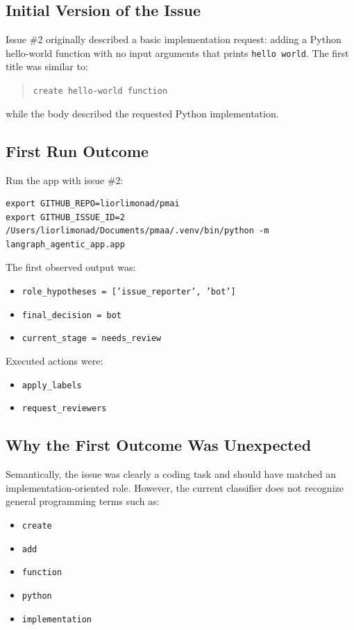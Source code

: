 \documentclass[11pt,a4paper]{article}
\begin{document}
\subsection{Initial Version of the Issue}

Issue \#2 originally described a basic implementation request: adding a Python hello-world function with no input arguments that prints \texttt{hello world}. The first title was similar to:

\begin{quote}
\texttt{create hello-world function}
\end{quote}

while the body described the requested Python implementation.

\subsection{First Run Outcome}

Run the app with issue \#2:

\begin{lstlisting}[style=bashstyle]
export GITHUB_REPO=liorlimonad/pmai
export GITHUB_ISSUE_ID=2
/Users/liorlimonad/Documents/pmaa/.venv/bin/python -m langraph_agentic_app.app
\end{lstlisting}

The first observed output was:
\begin{itemize}
    \item \texttt{role\_hypotheses = ['issue\_reporter', 'bot']}
    \item \texttt{final\_decision = bot}
    \item \texttt{current\_stage = needs\_review}
\end{itemize}

Executed actions were:
\begin{itemize}
    \item \texttt{apply\_labels}
    \item \texttt{request\_reviewers}
\end{itemize}

\subsection{Why the First Outcome Was Unexpected}

Semantically, the issue was clearly a coding task and should have matched an implementation-oriented role. However, the current classifier does not recognize general programming terms such as:
\begin{itemize}
    \item \texttt{create}
    \item \texttt{add}
    \item \texttt{function}
    \item \texttt{python}
    \item \texttt{implementation}
\end{itemize}
\end{document}
